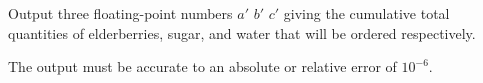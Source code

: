 

Output three floating-point numbers $a'$ $b'$ $c'$ giving the cumulative total
quantities of elderberries, sugar, and water that will be ordered respectively.

The output must be accurate to an absolute or relative error of $10^{-6}$.
